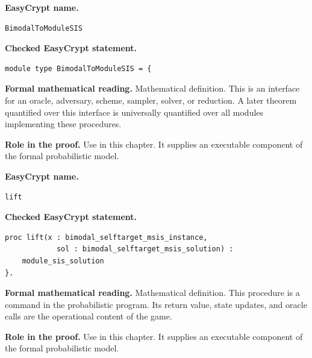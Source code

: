 \begin{formaldefinition}
\noindent\textbf{EasyCrypt name.}
\begin{lstlisting}[language=EasyCrypt,basicstyle=\ttfamily\scriptsize]
BimodalToModuleSIS
\end{lstlisting}
\noindent\textbf{Checked EasyCrypt statement.}
\begin{lstlisting}[language=EasyCrypt,basicstyle=\ttfamily\scriptsize]
module type BimodalToModuleSIS = {
\end{lstlisting}
\noindent\textbf{Formal mathematical reading.}
Mathematical definition. This is an interface for an oracle, adversary, scheme, sampler, solver, or reduction.  A later theorem quantified over this interface is universally quantified over all modules implementing these procedures.

\noindent\textbf{Role in the proof.}
Use in this chapter. It supplies an executable component of the formal probabilistic model.

\end{formaldefinition}

\begin{formaldefinition}
\noindent\textbf{EasyCrypt name.}
\begin{lstlisting}[language=EasyCrypt,basicstyle=\ttfamily\scriptsize]
lift
\end{lstlisting}
\noindent\textbf{Checked EasyCrypt statement.}
\begin{lstlisting}[language=EasyCrypt,basicstyle=\ttfamily\scriptsize]
proc lift(x : bimodal_selftarget_msis_instance,
            sol : bimodal_selftarget_msis_solution) :
    module_sis_solution
}.
\end{lstlisting}
\noindent\textbf{Formal mathematical reading.}
Mathematical definition. This procedure is a command in the probabilistic program.  Its return value, state updates, and oracle calls are the operational content of the game.

\noindent\textbf{Role in the proof.}
Use in this chapter. It supplies an executable component of the formal probabilistic model.

\end{formaldefinition}

